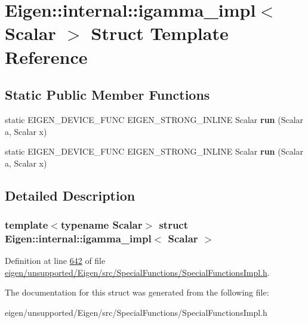 \hypertarget{struct_eigen_1_1internal_1_1igamma__impl}{}\section{Eigen\+:\+:internal\+:\+:igamma\+\_\+impl$<$ Scalar $>$ Struct Template Reference}
\label{struct_eigen_1_1internal_1_1igamma__impl}
\subsection*{Static Public Member Functions}
\begin{DoxyCompactItemize}
\item 
\mbox{\label{struct_eigen_1_1internal_1_1igamma__impl_addc92285f27b7153bdf25f7bfa11dab9}} 
static E\+I\+G\+E\+N\+\_\+\+D\+E\+V\+I\+C\+E\+\_\+\+F\+U\+NC E\+I\+G\+E\+N\+\_\+\+S\+T\+R\+O\+N\+G\+\_\+\+I\+N\+L\+I\+NE Scalar {\bfseries run} (Scalar a, Scalar x)
\item 
\mbox{\label{struct_eigen_1_1internal_1_1igamma__impl_addc92285f27b7153bdf25f7bfa11dab9}} 
static E\+I\+G\+E\+N\+\_\+\+D\+E\+V\+I\+C\+E\+\_\+\+F\+U\+NC E\+I\+G\+E\+N\+\_\+\+S\+T\+R\+O\+N\+G\+\_\+\+I\+N\+L\+I\+NE Scalar {\bfseries run} (Scalar a, Scalar x)
\end{DoxyCompactItemize}


\subsection{Detailed Description}
\subsubsection*{template$<$typename Scalar$>$\newline
struct Eigen\+::internal\+::igamma\+\_\+impl$<$ Scalar $>$}



Definition at line \hyperlink{eigen_2unsupported_2_eigen_2src_2_special_functions_2_special_functions_impl_8h_source_l00642}{642} of file \hyperlink{eigen_2unsupported_2_eigen_2src_2_special_functions_2_special_functions_impl_8h_source}{eigen/unsupported/\+Eigen/src/\+Special\+Functions/\+Special\+Functions\+Impl.\+h}.



The documentation for this struct was generated from the following file\+:\begin{DoxyCompactItemize}
\item 
eigen/unsupported/\+Eigen/src/\+Special\+Functions/\+Special\+Functions\+Impl.\+h\end{DoxyCompactItemize}
